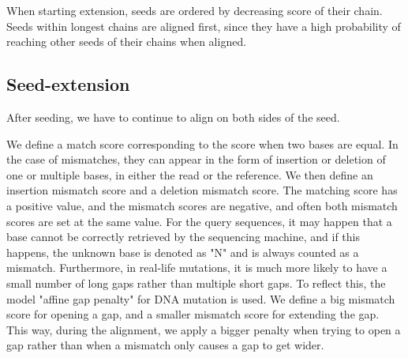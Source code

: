 When starting extension, seeds are ordered by decreasing score of their chain. Seeds within longest chains are aligned first, since they have a high probability of reaching other seeds of their chains when aligned.

\subsection{Seed-extension}
\label{sec:local}
After seeding, we have to continue to align on both sides of the seed. 


We define a match score corresponding to the score when two bases are equal. In the case of mismatches, they can appear in the form of insertion or deletion of one or multiple bases, in either the read or the reference. We then define an insertion mismatch score and a deletion mismatch score. The matching score has a positive value, and the mismatch scores are negative, and often both mismatch scores are set at the same value. For the query sequences, it may happen that a base cannot be correctly retrieved by the sequencing machine, and if this happens, the unknown base is denoted as "N" and is always counted as a mismatch. Furthermore, in real-life mutations, it is much more likely to have a small number of long gaps rather than multiple short gaps. To reflect this, the model "affine gap penalty" for DNA mutation is used. We define a big mismatch score for opening a gap, and a smaller mismatch score for extending the gap. This way, during the alignment, we apply a bigger penalty when trying to open a gap rather than when a mismatch only causes a gap to get wider. 

